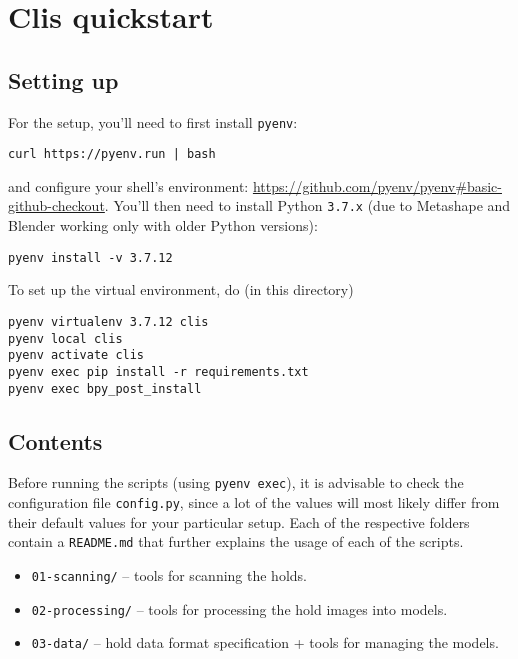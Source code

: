 \chapter{Clis quickstart}\label{apx:clis}

\section{Setting up}

For the setup, you'll need to first install \texttt{pyenv}:

\begin{verbatim}
curl https://pyenv.run | bash
\end{verbatim}

and configure your shell's environment: \url{https://github.com/pyenv/pyenv\#basic-github-checkout}.
You'll then need to install Python \texttt{3.7.x} (due to Metashape and Blender working only with older Python versions):

\begin{verbatim}
pyenv install -v 3.7.12
\end{verbatim}

To set up the virtual environment, do (in this directory)

\begin{verbatim}
pyenv virtualenv 3.7.12 clis
pyenv local clis
pyenv activate clis
pyenv exec pip install -r requirements.txt
pyenv exec bpy_post_install
\end{verbatim}

\section{Contents}

Before running the scripts (using \texttt{pyenv\ exec}), it is advisable
to check the configuration file \texttt{config.py}, since a lot of the values will most likely
differ from their default values for your particular setup. Each of the
respective folders contain a \texttt{README.md} that further explains
the usage of each of the scripts.

\begin{itemize}
	\item \texttt{01-scanning/} -- tools for scanning the holds.
	\item \texttt{02-processing/} -- tools for processing the hold images into models.
	\item \texttt{03-data/} -- hold data format specification + tools for managing the models.
\end{itemize}

